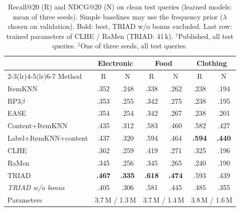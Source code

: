 \documentclass[runningheads]{llncs}
\begin{document}
\begin{table}[t]
\centering
\caption{Recall@20 (R) and NDCG@20 (N) on clean test queries (learned models: mean of three seeds). Simple baselines may
use the frequency prior ($\lambda$ chosen on validation). Bold: best, TRIAD w/o bonus excluded. Last row: trained
parameters of CLHE / RaMen (TRIAD: 41\,k). $^\dagger$Published, all test queries. $^\ddagger$One of three seeds, all
test queries.}
\label{tab:main}
\setlength{\tabcolsep}{3.2pt}
\scriptsize
\begin{tabular}{lcccccc}
\toprule
 & \multicolumn{2}{c}{Electronic} & \multicolumn{2}{c}{Food} & \multicolumn{2}{c}{Clothing}\\
\cmidrule(lr){2-3}\cmidrule(lr){4-5}\cmidrule(lr){6-7}
Method & R & N & R & N & R & N\\
\midrule
ItemKNN & .352 & .248 & .338 & .262 & .238 & .194\\
RP3$\beta$ & .353 & .255 & .342 & .275 & .238 & .195\\
EASE & .354 & .254 & .342 & .267 & .238 & .201\\
Content+ItemKNN & .435 & .312 & .583 & .460 & .582 & .427\\
Label+ItemKNN+content & .437 & .320 & .594 & .464 & \textbf{.594} & \textbf{.440}\\
\midrule
CLHE & .362 & .259 & .419 & .271 & .325 & .196\\
RaMen & .345 & .256 & .345 & .265 & .240 & .190\\
\midrule
TRIAD & \textbf{.467} & \textbf{.335} & \textbf{.618} & \textbf{.474} & .593 & .439\\
\emph{TRIAD w/o bonus} & .405 & .306 & .581 & .445 & .485 & .355\\
\midrule
Parameters & \multicolumn{2}{c}{3.7\,M / 1.3\,M} & \multicolumn{2}{c}{3.7\,M / 1.4\,M} & \multicolumn{2}{c}{3.8\,M / 1.6\,M}\\
\bottomrule
\end{tabular}


\end{table}
\end{document}
